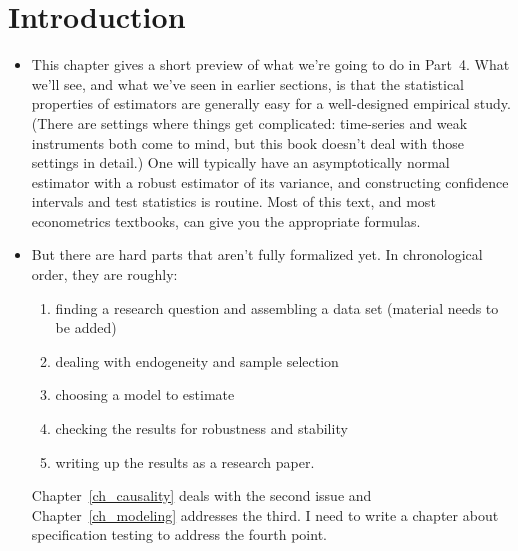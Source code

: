 

\chapter{Introduction}

\begin{itemize}[leftmargin=0pt]

\item This chapter gives a short preview of what we're going to do in
  Part~4. What we'll see, and what we've seen in earlier sections, is
  that the statistical properties of estimators are generally easy for
  a well-designed empirical study. (There are settings where things
  get complicated: time-series and weak instruments both come to mind,
  but this book doesn't deal with those settings in detail.) One will
  typically have an asymptotically normal estimator with a robust
  estimator of its variance, and constructing confidence intervals and
  test statistics is routine.  Most of this text, and most
  econometrics textbooks, can give you the appropriate formulas.

\item But there are hard parts that aren't fully formalized yet. In
  chronological order, they are roughly:
  \begin{enumerate}
  \item finding a research question and assembling a data set
    (material needs to be added)
  \item dealing with endogeneity and sample selection
  \item choosing a model to estimate
  \item checking the results for robustness and stability
  \item writing up the results as a research paper.
  \end{enumerate}
  Chapter~\ref{ch_causality} deals with the second issue and
  Chapter~\ref{ch_modeling} addresses the third. I need to write a
  chapter about specification testing to address the fourth point.


\end{itemize}
